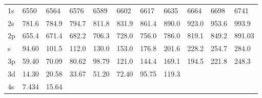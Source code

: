 \begin{table}
\begin{tabular}{lllllllllll}
\hline
1s&  6550&  6564&  6576&  6589&  6602&  6617&  6635&  6664&  6698&  6741\\
2s&
781.6& 784.9& 794.7& 811.8& 831.9& 861.4& 890.0& 923.0& 953.6& 993.9\\
2p& 655.4& 671.4&
682.2& 706.3& 728.0& 756.0& 786.0& 819.1& 849.2& 891.03\\
s& 94.60& 101.5& 112.0& 130.0&
153.0& 176.8& 201.6& 228.2& 254.7& 284.0\\
3p& 59.40& 70.09& 80.62& 98.79& 121.0& 144.4&
169.1& 194.5& 221.8& 248.3\\
3d& 14.30& 20.58& 33.67& 51.20& 72.40& 95.75& 119.3\\
4s& 7.434&
15.64\\
\hline
\end{tabular}
\end{table}


